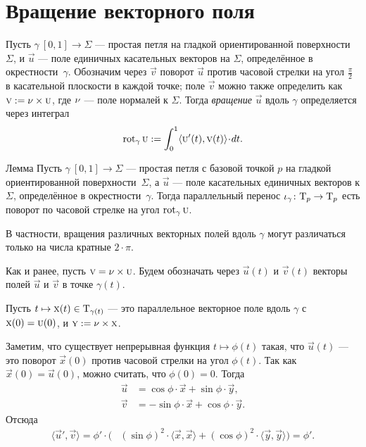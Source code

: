 \section{Вращение векторного поля}

Пусть $\gamma\:[0,1]\to \Sigma$ --- простая петля на гладкой ориентированной поверхности~$\Sigma$,
и $\vec u$ --- поле единичных касательных векторов на $\Sigma$, определённое в окрестности~$\gamma$.
Обозначим через $\vec v$ поворот $\vec u$ против часовой стрелки на угол $\tfrac{\pi}2$ в касательной плоскости в каждой точке; поле $\vec v$ можно также определить как $\text{\sc{v}}\mathrel{:=}\nu\times\text{\sc{u}}$, где $\nu$ --- поле нормалей к $\Sigma$.
Тогда \emph{вращение} $\vec u$ вдоль $\gamma$ определяется через интеграл
\[\rot_\gamma\vec u
\df
\int_0^1\langle\vec u'(t),\vec v(t)\rangle\cdot dt.\]

\begin{thm}{Лемма}\label{lem:rotation-parallel}
Пусть $\gamma\:[0,1]\to \Sigma$ --- простая петля с базовой точкой $p$ на гладкой ориентированной поверхности~$\Sigma$, а $\vec u$ --- поле касательных единичных векторов к $\Sigma$, определённое в окрестности~$\gamma$.
Тогда параллельный перенос $\iota_\gamma\colon\mathrm{T}_p\to\mathrm{T}_p$ есть поворот по часовой стрелке на угол $\mathop{\rm rot}\nolimits_\gamma\text{\sc{u}}$.

В частности, вращения различных векторных полей вдоль $\gamma$ могут различаться только на числа кратные $2\cdot\pi$.
\end{thm}

Как и ранее, пусть $\text{\sc{v}}=\nu\times\text{\sc{u}}$. 
Будем обозначать через $\vec u(t)$ и $\vec v(t)$ векторы полей $\vec u$ и $\vec v$ в точке $\gamma(t)$.

Пусть $t\mapsto \text{\sc{x}}(t)\in \mathrm{T}_{\gamma(t)}$ --- это параллельное векторное поле вдоль $\gamma$ с  $\vec x(0)\z=\vec u(0)$, и $\text{\sc{y}}\mathrel{:=}\nu\times\text{\sc{x}}$.

Заметим, что существует непрерывная функция $t\mapsto \phi(t)$ такая, что 
$\vec u(t)$ --- это поворот $\vec x(0)$ против часовой стрелки на угол $\phi(t)$.
Так как $\vec x(0)=\vec u(0)$, можно считать, что $\phi(0)=0$.
Тогда
\begin{align*}
\vec u&=\cos\phi\cdot \vec x+\sin\phi\cdot \vec y,
\\
\vec v&=-\sin\phi\cdot \vec x+\cos\phi\cdot \vec y.
\end{align*}
Отсюда
\begin{align*}
\langle\vec u',\vec v\rangle
=\phi'\cdot\biggl(&(\sin \phi)^2\cdot \langle\vec x,\vec x\rangle+(\cos \phi)^2\cdot \langle\vec y,\vec y\rangle
\biggr)=
\phi'.
\end{align*}

